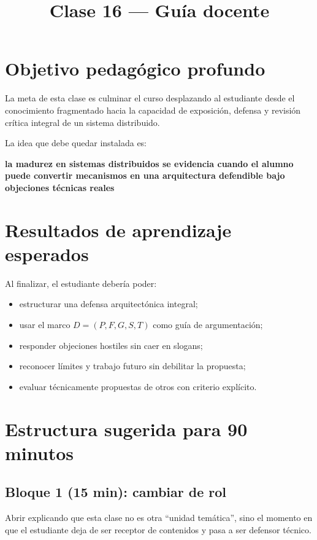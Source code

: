\documentclass[variant=docente,cover=institutional,mode=screen]{ua-engineering-v6-article}
\title{Clase 16 --- Guía docente}
\author{\UAProfessor}
\date{\UADate}
\begin{document}
\maketitle

\section{Objetivo pedagógico profundo}

La meta de esta clase es culminar el curso desplazando al estudiante desde el conocimiento fragmentado hacia la capacidad de exposición, defensa y revisión crítica integral de un sistema distribuido.

La idea que debe quedar instalada es:

\begin{center}
\textbf{la madurez en sistemas distribuidos se evidencia cuando el alumno puede convertir mecanismos en una arquitectura defendible bajo objeciones técnicas reales}
\end{center}

\section{Resultados de aprendizaje esperados}

Al finalizar, el estudiante debería poder:

\begin{itemize}
\item estructurar una defensa arquitectónica integral;
\item usar el marco $D=(P,F,G,S,T)$ como guía de argumentación;
\item responder objeciones hostiles sin caer en slogans;
\item reconocer límites y trabajo futuro sin debilitar la propuesta;
\item evaluar técnicamente propuestas de otros con criterio explícito.
\end{itemize}

\section{Estructura sugerida para 90 minutos}

\subsection*{Bloque 1 (15 min): cambiar de rol}
Abrir explicando que esta clase no es otra “unidad temática”, sino el momento en que el estudiante deja de ser receptor de contenidos y pasa a ser defensor técnico.
\end{document}
